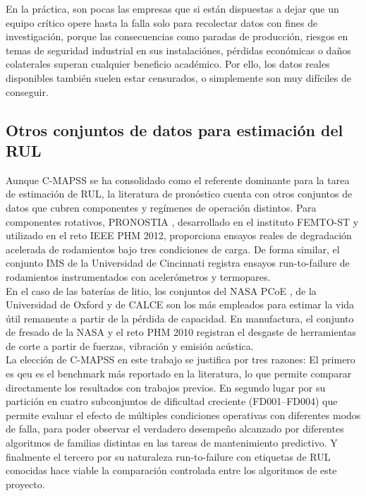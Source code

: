 En la práctica, son pocas las empresas que si están dispuestas a dejar que un equipo crítico opere hasta la falla solo para recolectar datos con fines de investigación, porque las consecuencias como paradas de producción, riesgos en temas de seguridad industrial en sus instalaciónes, pérdidas económicas o daños colaterales superan cualquier beneficio académico. Por ello, los datos reales disponibles también suelen estar censurados, o simplemente son muy difíciles de conseguir.

\subsection{Otros conjuntos de datos para estimación del RUL}

Aunque C-MAPSS se ha consolidado como el referente dominante para la tarea de estimación de RUL, la literatura de pronóstico cuenta con otros conjuntos de datos que cubren componentes y regímenes de operación distintos. Para componentes rotativos, PRONOSTIA \cite{nectoux2012}, desarrollado en el instituto FEMTO-ST y utilizado en el reto IEEE PHM 2012, proporciona ensayos reales de degradación acelerada de rodamientos bajo tres condiciones de carga. De forma similar, el conjunto IMS de la Universidad de Cincinnati \cite{qiu2006} registra ensayos run-to-failure de rodamientos instrumentados con acelerómetros y termopares.\\[.15cm]

En el caso de las baterías de litio, los conjuntos del NASA PCoE \cite{saha2007}, de la Universidad de Oxford \cite{howey2017} y de CALCE \cite{xing2013} son los más empleados para estimar la vida útil remanente a partir de la pérdida de capacidad. En manufactura, el conjunto de fresado de la NASA \cite{agogino2007} y el reto PHM 2010 registran el desgaste de herramientas de corte a partir de fuerzas, vibración y emisión acústica.\\[.15cm]

La elección de C-MAPSS en este trabajo se justifica por tres razones: El primero es qeu es el benchmark más reportado en la literatura, lo que permite comparar directamente los resultados con trabajos previos. En segundo lugar por su partición en cuatro subconjuntos de dificultad creciente (FD001--FD004) que permite evaluar el efecto de múltiples condiciones operativas con diferentes modos de falla, para poder observar el verdadero desempeño alcanzado por diferentes algoritmos de familias distintas en las tareas de mantenimiento predictivo. Y finalmente el tercero por su naturaleza run-to-failure con etiquetas de RUL conocidas hace viable la comparación controlada entre los algoritmos de este proyecto.

